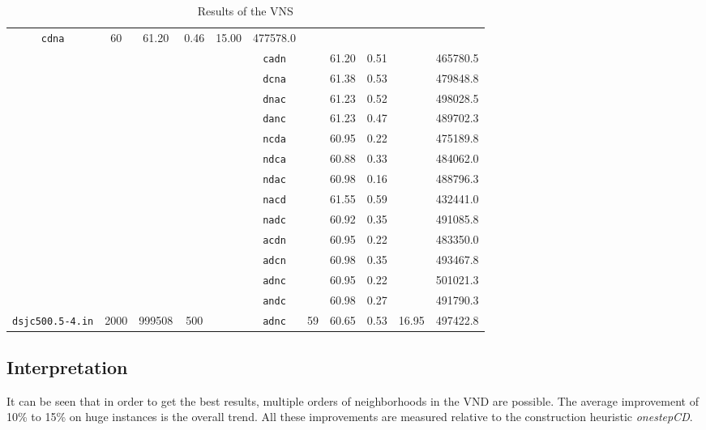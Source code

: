 \documentclass[paper = a4, fontsize = 10pt]{scrartcl}
\begin{document}
\begin{table}[h]
\begin{tabular}{|c|ccc|c|c|ccc|c|c|}
      \texttt{cdna}	& \multirow{14}{*}{60}	& 61.20	& 0.46	& \multirow{14}{*}{15.00}	& 477578.0\\
&&&&& \texttt{cadn}	&			& 61.20	& 0.51	&				& 465780.5\\
&&&&& \texttt{dcna}	&			& 61.38	& 0.53	&				& 479848.8\\
&&&&& \texttt{dnac}	&			& 61.23	& 0.52	&				& 498028.5\\
&&&&& \texttt{danc}	&			& 61.23	& 0.47	&				& 489702.3\\
&&&&& \texttt{ncda}	&			& 60.95	& 0.22	&				& 475189.8\\
&&&&& \texttt{ndca}	&			& 60.88	& 0.33	&				& 484062.0\\
&&&&& \texttt{ndac}	&			& 60.98	& 0.16	&				& 488796.3\\
&&&&& \texttt{nacd}	&			& 61.55	& 0.59	&				& 432441.0\\
&&&&& \texttt{nadc}	&			& 60.92	& 0.35	&				& 491085.8\\
&&&&& \texttt{acdn}	&			& 60.95	& 0.22	&				& 483350.0\\
&&&&& \texttt{adcn}	&			& 60.98	& 0.35	&				& 493467.8\\
&&&&& \texttt{adnc}	&			& 60.95	& 0.22	&				& 501021.3\\
&&&&& \texttt{andc}	&			& 60.98	& 0.27	&				& 491790.3\\
\cline{1-4}\cline{6-11}
\texttt{dsjc500.5-4.in} & 2000 & 999508 & 500 & & \texttt{adnc} & 59 & 60.65 & 0.53 & 16.95 & 497422.8\\
\hline
\end{tabular}
\caption{Results of the VNS}
\label{tab:result}
\end{table}

\subsection{Interpretation}
It can be seen that in order to get the best results, multiple orders of neighborhoods in the VND are possible. The average improvement of 10\% to 15\% on huge instances is the overall trend. All these improvements are measured relative to the construction heuristic \emph{onestepCD}.

\end{document}
